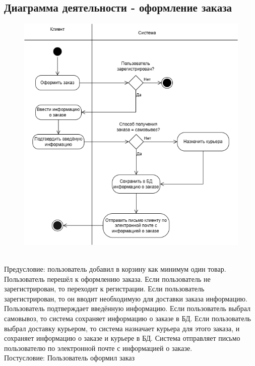 \documentclass[a4paper]{report}
\begin{document}
\subsection{Диаграмма деятельности - оформление заказа}
\begin{figure}[h]
    \centering
    \includegraphics[width=\textwidth]{Диаграмма деятельности формирования заказа.png}
\end{figure}
$$$$\\
Предусловие: пользователь добавил в корзину как минимум один товар.\\
Пользователь перешёл к оформлению заказа. Если пользователь не зарегистрирован, то переходит к регистрации. Если пользователь зарегистрирован, то он вводит необходимую для доставки заказа информацию. Пользователь подтверждает введённую информацию. Если пользователь выбрал самовывоз, то система сохраняет информацию о заказе в БД. Если пользователь выбрал доставку курьером, то система назначает курьера для этого заказа, и сохраняет информацию о заказе и курьере в БД. Система отправляет письмо пользователю по электронной почте с информацией о заказе.\\
Постусловие: Пользователь оформил заказ\\
\newpage 
\end{document}
